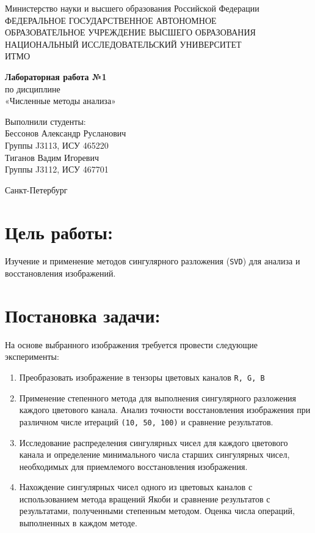 \documentclass[a4paper,12pt]{article}
\begin{document}
\begin{center}
\small Министерство науки и высшего образования Российской Федерации\\
ФЕДЕРАЛЬНОЕ ГОСУДАРСТВЕННОЕ АВТОНОМНОЕ\\
ОБРАЗОВАТЕЛЬНОЕ УЧРЕЖДЕНИЕ ВЫСШЕГО ОБРАЗОВАНИЯ\\
НАЦИОНАЛЬНЫЙ ИССЛЕДОВАТЕЛЬСКИЙ УНИВЕРСИТЕТ\\
ИТМО
\vfill

\Large\textbf{Лабораторная работа №1}\\
\small{по дисциплине}\\
\small{«Численные методы анализа»}
\vfill
\thispagestyle{empty}

\begin{center}
Выполнили студенты:\\
\vspace{0.3cm}
Бессонов Александр Русланович\\
Группы J3113, ИСУ 465220\\
\vspace{0.3cm}
Тиганов Вадим Игоревич\\
Группы J3112, ИСУ 467701
\end{center}
\vfill

Санкт-Петербург\\
\the\year
\end{center}

\newpage



\tableofcontents


\newpage

\section{Цель работы:}
Изучение и применение методов сингулярного разложения (\verb|SVD|) для анализа
и восстановления изображений. 

\section{Постановка задачи:}
На основе выбранного изображения требуется провести следующие эксперименты:
\begin{enumerate}
    \item Преобразовать изображение в тензоры цветовых каналов \verb|R, G, B|
    \item Применение степенного метода для выполнения сингулярного разложения каждого цветового канала. Анализ точности восстановления изображения при различном числе итераций \verb|(10, 50, 100)| и сравнение результатов.
    \item Исследование распределения сингулярных чисел для каждого цветового канала и определение минимального числа старших сингулярных чисел, необходимых для приемлемого восстановления изображения.
    \item Нахождение сингулярных чисел одного из цветовых каналов с использованием метода вращений Якоби и сравнение результатов с результатами, полученными степенным методом. Оценка числа операций, выполненных в каждом методе.
\end{enumerate}
\end{document}
